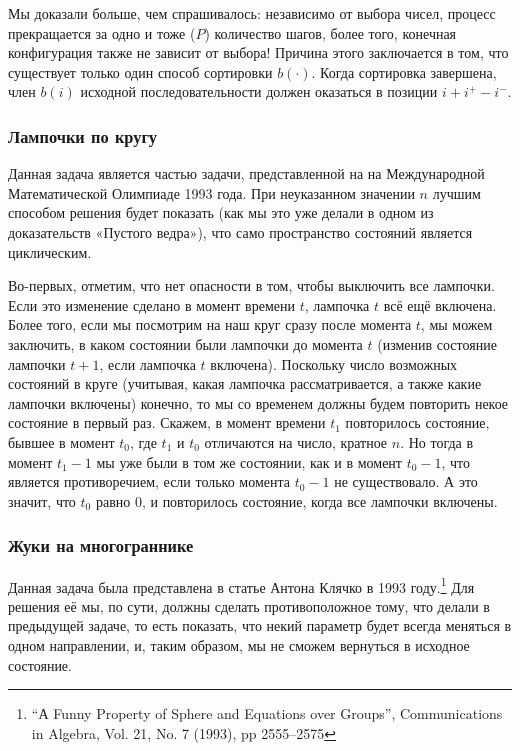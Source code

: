 Мы доказали больше, чем спрашивалось: независимо от выбора чисел, процесс прекращается за одно и тоже ($P$) количество шагов, более того, конечная конфигурация также не зависит от выбора!
Причина этого заключается в том, что существует только один способ сортировки $b(\cdot)$.
Когда сортировка завершена, член $b(i)$ исходной последовательности должен оказаться в позиции $i + i^+ - i^-$.
\heart

\subsubsection*{Лампочки по кругу}%

Данная задача является частью задачи, представленной на на Международной Математической Олимпиаде 1993 года.
При неуказанном значении $n$ лучшим способом решения будет показать (как мы это уже делали в одном из доказательств «Пустого ведра»), что само пространство состояний является циклическим.

\medskip

Во-первых, отметим, что нет опасности в том, чтобы выключить все лампочки.
Если это изменение сделано в момент времени $t$, лампочка $t$ всё ещё включена.
Более того, если мы посмотрим на наш круг сразу после момента $t$, мы можем заключить, в каком состоянии были лампочки до момента $t$ (изменив состояние лампочки $t + 1$, если лампочка $t$ включена).
Поскольку число возможных состояний в круге (учитывая, какая лампочка рассматривается, а также какие лампочки включены) конечно, то мы со временем должны будем повторить некое состояние в первый раз.
Скажем, в момент времени $t_1$ повторилось состояние, бывшее в момент $t_0$, где $t_1$ и $t_0$ отличаются на число, кратное $n$.
Но тогда в момент $t_1 - 1$ мы уже были в том же состоянии, как и в момент $t_0 - 1$, что является противоречием, если только момента $t_0 - 1$ не существовало.
А это значит, что $t_0$ равно $0$, и повторилось состояние, когда все лампочки включены.
\heart

\subsubsection*{Жуки на многограннике}%

Данная задача была представлена в статье Антона Клячко в 1993 году.\footnote{“А Funny Property of Sphere and Equations over Groups”, Communications in Algebra, Vol. 21, No. 7 (1993), pp 2555--2575} 
Для решения её мы, по сути, должны сделать противоположное тому, что делали в предыдущей задаче, то есть показать, что некий параметр будет всегда меняться в одном направлении, и, таким образом, мы не сможем вернуться в исходное состояние.

